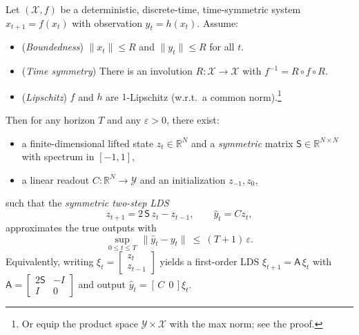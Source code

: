 \documentclass[10pt,a4paper]{amsart}
\begin{document}
\begin{theorem}\label{thm:symm-lift}
Let $(\mathcal{X},f)$ be a deterministic, discrete-time, time-symmetric system $x_{t+1}=f(x_t)$ with observation $y_t=h(x_t)$.
Assume:
\begin{itemize}
\item[(A1)] (\emph{Boundedness}) $\|x_t\|\le R$ and $\|y_t\|\le R$ for all $t$.
\item[(A2)] (\emph{Time symmetry}) There is an involution $R:\mathcal{X}\to\mathcal{X}$ with $f^{-1}=R\circ f\circ R$.
\item[(A3)] (\emph{Lipschitz}) $f$ and $h$ are $1$-Lipschitz (w.r.t.\ a common norm).\footnote{Or equip the product space $\mathcal{Y}\times\mathcal{X}$ with the max norm; see the proof.}
\end{itemize}
Then for any horizon $T$ and any $\varepsilon>0$, there exist:
\begin{itemize}
\item a finite-dimensional lifted state $z_t\in\mathbb{R}^N$ and a \emph{symmetric} matrix $\mathsf{S}\in\mathbb{R}^{N\times N}$ with spectrum in $[-1,1]$,
\item a linear readout $C:\mathbb{R}^N\to\mathcal{Y}$ and an initialization $z_{-1},z_0$,
\end{itemize}
such that the \emph{symmetric two-step LDS}
\[
z_{t+1}=2\,\mathsf{S}\,z_t-z_{t-1},\qquad \hat y_t=C z_t,
\]
approximates the true outputs with
\[
\sup_{0\le t\le T}\,\|\hat y_t-y_t\|\ \le\ (T+1)\,\varepsilon.
\]
Equivalently, writing $\xi_t=\begin{bmatrix}z_t\\ z_{t-1}\end{bmatrix}$ yields a first-order LDS
$\xi_{t+1}=\mathsf{A}\,\xi_t$ with
$\mathsf{A}=\begin{bmatrix}2\mathsf{S}&-I\\ I&0\end{bmatrix}$ and output $\hat y_t=[\,C\ \ 0\,]\xi_t$.
\end{theorem}
\end{document}
